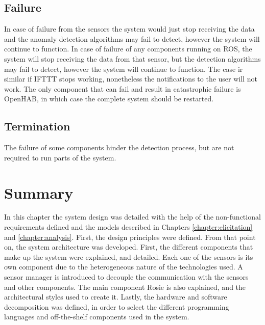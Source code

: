 \subsection{Failure}
In case of failure from the sensors the system would just stop receiving the data and the anomaly detection algorithms may fail to detect, however the system will continue to function. In case of failure of any components running on ROS, the system will stop receiving the data from that sensor, but the detection algorithms may fail to detect, however the system will continue to function. The case ir similar if IFTTT stops working, nonetheless the notifications to the user will not work. The only component that can fail and result in catastrophic failure is OpenHAB, in which case the complete system should be restarted.

\subsection{Termination}
The failure of some components hinder the detection process, but are not required to run parts of the system.


\section{Summary}
In this chapter the system design was detailed with the help of the non-functional requirements defined and the models described in Chapters \ref{chapter:elicitation} and \ref{chapter:analysis}. First, the design principles were defined. From that point on, the system architecture was developed. First, the different components that make up the system were explained, and detailed. Each one of the sensors is its own component due to the heterogeneous nature of the technologies used. A sensor manager is introduced to decouple the communication with the sensors and other components. The main component Rosie is also explained, and the architectural styles used to create it. Lastly, the hardware and software decomposition was defined, in order to select the different programming languages and off-the-shelf components used in the system.